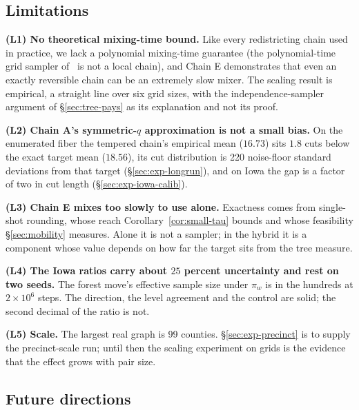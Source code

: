 \documentclass[11pt]{article}
\begin{document}
\subsection{Limitations}\label{sec:disc-limits}

\textbf{(L1) No theoretical mixing-time bound.} Like every
redistricting chain used in practice, we lack a polynomial
mixing-time guarantee (the polynomial-time grid sampler
of~\cite{cannon2024sampling} is not a local chain), and Chain E
demonstrates that even an exactly reversible chain can be an
extremely slow mixer. The scaling result is empirical, a straight
line over six grid sizes, with the independence-sampler argument of
\S\ref{sec:tree-pays} as its explanation and not its proof.

\textbf{(L2) Chain A's symmetric-$q$ approximation is not a small
bias.} On the enumerated fiber the tempered chain's empirical mean
($16.73$) sits $1.8$ cuts below the exact target mean ($18.56$), its
cut distribution is 220 noise-floor standard deviations from that
target (\S\ref{sec:exp-longrun}), and on Iowa the gap is a factor of
two in cut length (\S\ref{sec:exp-iowa-calib}).

\textbf{(L3) Chain E mixes too slowly to use alone.} Exactness comes
from single-shot rounding, whose reach Corollary~\ref{cor:small-tau}
bounds and whose feasibility \S\ref{sec:mobility} measures. Alone it
is not a sampler; in the hybrid it is a component whose value depends
on how far the target sits from the tree measure.

\textbf{(L4) The Iowa ratios carry about $25$ percent uncertainty and
rest on two seeds.} The forest move's effective sample size under
$\pi_w$ is in the hundreds at $2 \times 10^6$ steps. The direction,
the level agreement and the control are solid; the second decimal of
the ratio is not.

\textbf{(L5) Scale.} The largest real graph is 99 counties.
\S\ref{sec:exp-precinct} is to supply the precinct-scale run; until
then the scaling experiment on grids is the evidence that the effect
grows with pair size.

\subsection{Future directions}\label{sec:disc-future}
\end{document}

